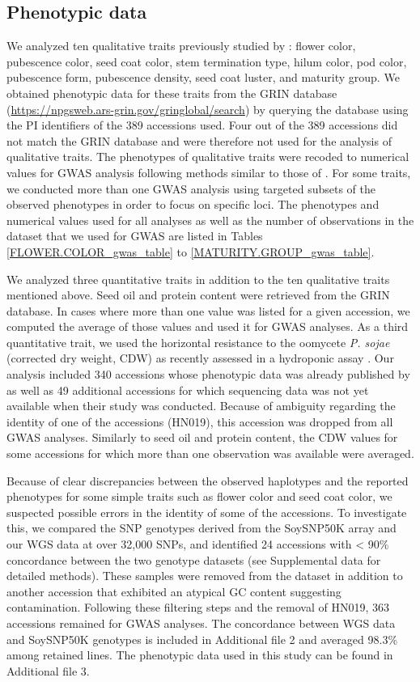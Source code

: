 \subsection*{Phenotypic data}
\label{sv-gwas-phenotypic-data}

We analyzed ten qualitative traits previously studied by \cite{bandillo2017}: flower
color, pubescence color, seed coat color, stem termination type, hilum color,
pod color, pubescence form, pubescence density, seed coat luster, and maturity
group.  We obtained phenotypic data for these traits from the GRIN database
(\url{https://npgsweb.ars-grin.gov/gringlobal/search}) by querying the database
using the PI identifiers of the 389 accessions used.  Four out of the 389
accessions did not match the GRIN database and were therefore not used for the
analysis of qualitative traits. The phenotypes of qualitative traits were recoded
to numerical values for GWAS analysis following methods similar to those of
\cite{bandillo2017}.  For some traits, we conducted more than one GWAS analysis
using targeted subsets of the observed phenotypes in order to focus on specific
loci. The phenotypes and numerical values used for all analyses as well as the
number of observations in the dataset that we used for GWAS are listed in
Tables \ref{FLOWER.COLOR_gwas_table} to \ref{MATURITY.GROUP_gwas_table}.

We analyzed three quantitative traits in addition to the ten qualitative traits
mentioned above. Seed oil and protein content were retrieved from the GRIN
database. In cases where more than one value was listed for a given accession,
we computed the average of those values and used it for GWAS analyses. As a third quantitative trait, we
used the horizontal resistance to the oomycete \textit{P. sojae} (corrected dry
weight, CDW) as recently assessed in a hydroponic assay \citep{deronne2022}.
Our analysis included 340 accessions whose phenotypic data
was already published by \cite{deronne2022} as well as 49 additional accessions for
which sequencing data was not yet available when their study was conducted.
Because of ambiguity regarding the identity of one of the accessions (HN019), this accession
was dropped from all GWAS analyses. Similarly to seed oil and
protein content, the CDW values for some accessions for which more than one
observation was available were averaged.

Because of clear discrepancies between the observed haplotypes and the reported
phenotypes for some simple traits such as flower color and seed coat color, we
suspected possible errors in the identity of some of the accessions. To
investigate this, we compared the SNP genotypes derived from the SoySNP50K
array and our WGS data at over 32,000 SNPs, and identified 24 accessions with <
90\% concordance between the two genotype datasets (see Supplemental data for
detailed methods). These samples were removed from the dataset in addition to another
accession that exhibited an atypical GC content suggesting contamination.
Following these filtering steps and the removal of HN019, 363 accessions
remained for GWAS analyses. The concordance between WGS data and SoySNP50K
genotypes is included in Additional file 2 and averaged 98.3\% among retained
lines. The phenotypic data used in this study can be found in Additional file 3.

